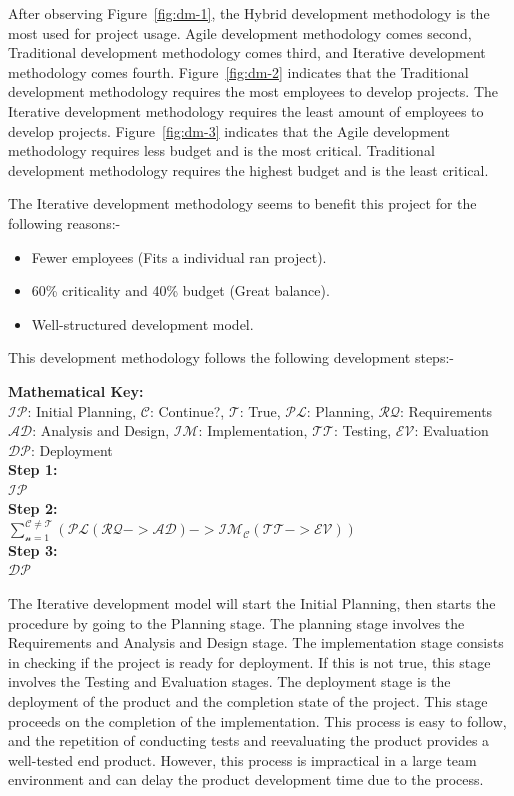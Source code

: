 \documentclass[12pt]{report} %
\begin{document}
		After observing Figure~\ref{fig:dm-1}, the Hybrid development methodology is the most used for project usage. Agile development methodology comes second, Traditional development methodology comes third, and Iterative development methodology comes fourth. Figure~\ref{fig:dm-2} indicates that the Traditional development methodology requires the most employees to develop projects. The Iterative development methodology requires the least amount of employees to develop projects. Figure~\ref{fig:dm-3} indicates that the Agile development methodology requires less budget and is the most critical. Traditional development methodology requires the highest budget and is the least critical.

		The Iterative development methodology seems to benefit this project for the following reasons:-
		\begin{itemize}
			\item Fewer employees (Fits a individual ran project).
			\item 60\% criticality and 40\% budget (Great balance).
			\item Well-structured development model.
		\end{itemize}

		This development methodology follows the following development steps:-

		\begin{center}
			\scriptsize
			\textbf{Mathematical Key:}\\
			$\mathcal{IP}$: Initial Planning, $\mathcal{C}$: Continue?, $\mathcal{T}$: True, $\mathcal{PL}$: Planning, $\mathcal{RQ}$: Requirements\\$\mathcal{AD}$: Analysis and Design, $\mathcal{IM}$: Implementation, $\mathcal{TT}$: Testing, $\mathcal{EV}$: Evaluation\\$\mathcal{DP}$: Deployment\\
			\textbf{Step 1:}\\
			$\mathcal{IP}$\\
			\textbf{Step 2:}\\ 
			$\mathcal{\sum_{n = 1}^{\mathcal{C\neq}\mathcal{T}}(\mathcal{PL}(\mathcal{RQ} -> \mathcal{AD}) -> \mathcal{IM}_{\mathcal{C}} (\mathcal{TT} -> \mathcal{EV}))}$\\
			\textbf{Step 3:}\\
			$\mathcal{DP}$
		\end{center}

		The Iterative development model will start the Initial Planning, then starts the procedure by going to the Planning stage. The planning stage involves the Requirements and Analysis and Design stage. The implementation stage consists in checking if the project is ready for deployment. If this is not true, this stage involves the Testing and Evaluation stages. The deployment stage is the deployment of the product and the completion state of the project. This stage proceeds on the completion of the implementation. This process is easy to follow, and the repetition of conducting tests and reevaluating the product provides a well-tested end product. However, this process is impractical in a large team environment and can delay the product development time due to the process.
\end{document}

